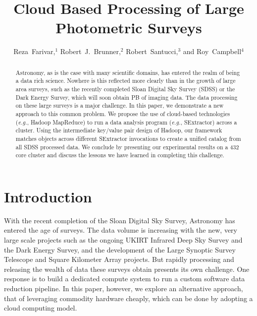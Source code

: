 
\resetcounters




\title{Cloud Based Processing of Large Photometric Surveys}
\author{Reza~Farivar,$^1$ Robert~J.~Brunner,$^2$ Robert~Santucci,$^3$ and Roy~Campbell$^4$
}


\begin{abstract}

Astronomy, as is the case with many scientific domains, has entered the realm of being a data rich science. Nowhere is this reflected more clearly than in the growth of large area surveys, such as the recently completed Sloan Digital Sky Survey (SDSS) or the Dark Energy Survey, which will soon obtain PB of imaging data. The data processing on these large surveys is a major challenge.
In this paper, we demonstrate a new approach to this common problem. We propose the use of cloud-based technologies (\textit{e.g.}, Hadoop MapReduce) to run a data analysis program (\textit{e.g.}, SExtractor) across a cluster.
Using the intermediate key/value pair design of Hadoop, our framework matches objects across different SExtractor invocations to create a unified catalog from all SDSS processed data. We conclude by presenting our experimental results on a 432 core cluster and discuss the lessons we have learned in completing this challenge.
\end{abstract}

\section{Introduction}
With the recent completion of the Sloan Digital Sky Survey, Astronomy has entered the age of surveys. The data volume is increasing with the new, very large scale projects such as the ongoing UKIRT Infrared Deep Sky Survey and the Dark Energy Survey, and the development of the Large Synoptic Survey Telescope and Square Kilometer Array projects. But rapidly processing and releasing the wealth of data these surveys obtain presents its own challenge. One response is to build a dedicated compute system to run a custom software data reduction pipeline. In this paper, however, we explore an alternative approach, that of leveraging commodity hardware cheaply, which can be done by adopting a cloud computing model. 


